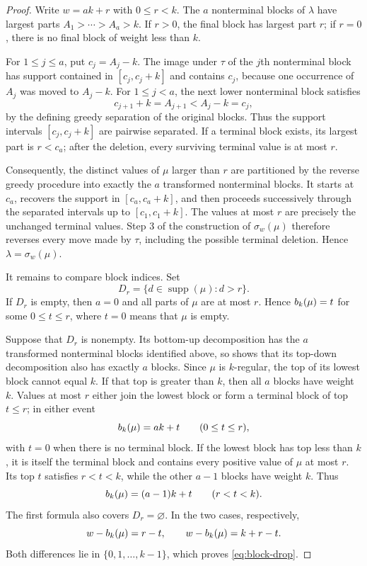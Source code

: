 \begin{proof}
Write $w=ak+r$ with $0\leq r<k$. The $a$ nonterminal blocks of $\lambda$ have
largest parts $A_1>\cdots>A_a>k$. If $r>0$, the final block has largest
part $r$; if $r=0$, there is no final block of weight less than $k$.

For $1\leq j\leq a$, put $c_j=A_j-k$. The image under $\tau$ of the $j$th
nonterminal block has support contained in $[c_j,c_j+k]$ and contains
$c_j$, because one occurrence of $A_j$ was moved to $A_j-k$. For
$1\leq j<a$, the next lower nonterminal block satisfies
\[
 c_{j+1}+k=A_{j+1}<A_j-k=c_j,
\]
by the defining greedy separation of the original blocks. Thus the support
intervals $[c_j,c_j+k]$ are pairwise separated. If a terminal block exists,
its largest part is $r<c_a$; after the deletion, every surviving terminal
value is at most $r$.

Consequently, the distinct values of $\mu$ larger than $r$ are partitioned by
the reverse greedy procedure into exactly the $a$ transformed nonterminal
blocks. It starts at $c_a$, recovers the support in $[c_a,c_a+k]$, and then
proceeds successively through the separated intervals up to $[c_1,c_1+k]$.
The values at most $r$ are precisely the unchanged terminal values. Step 3 of
the construction of $\sigma_w(\mu)$ therefore reverses every move made by
$\tau$, including the possible terminal deletion. Hence $\lambda=\sigma_w(\mu)$.

It remains to compare block indices. Set
\[
 D_r=\{d\in\operatorname{supp}(\mu):d>r\}.
\]
If $D_r$ is empty, then $a=0$ and all parts of $\mu$ are at most $r$.
Hence $b_k(\mu)=t$ for some $0\leq t\leq r$, where $t=0$ means that $\mu$
is empty.

Suppose that $D_r$ is nonempty. Its bottom-up decomposition has the $a$
transformed nonterminal blocks identified above, so 
shows that its top-down decomposition also has exactly $a$ blocks. Since $\mu$
is $k$-regular, the top of its lowest block cannot equal $k$. If that top is
greater than $k$, then all $a$ blocks have weight $k$. Values at most $r$ either
join the lowest block or form a terminal block of top $t\leq r$; in either event
\[
 b_k(\mu)=ak+t\qquad(0\leq t\leq r),
\]
with $t=0$ when there is no terminal block. If the lowest block has top less
than $k$, it is itself the terminal block and contains every positive value
of $\mu$ at most $r$. Its top $t$ satisfies $r<t<k$, while the other $a-1$
blocks have weight $k$. Thus
\[
 b_k(\mu)=(a-1)k+t\qquad(r<t<k).
\]
The first formula also covers $D_r=\varnothing$. In the two cases,
respectively,
\[
 w-b_k(\mu)=r-t,
 \qquad
 w-b_k(\mu)=k+r-t.
\]
Both differences lie in $\{0,1,\ldots,k-1\}$, which proves
\eqref{eq:block-drop}.
\end{proof}
